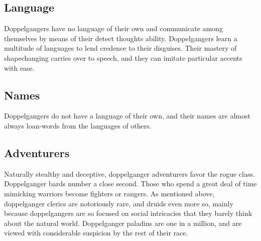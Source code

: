 
\subsection{Language}
{Doppelgangers have no language of their own and communicate among themselves by means of their detect thoughts ability. Doppelgangers learn a multitude of languages to lend credence to their disguises. Their mastery of shapechanging carries over to speech, and they can imitate particular accents with ease. \cite{d-destiny}}

\subsection{Names}
{Doppelgangers do not have a language of their own, and their names are almost always loan-words from the languages of others. \cite{d-hb}}
%

\subsection{Adventurers}
{Naturally stealthy and deceptive, doppelganger adventurers favor the rogue class. Doppelganger bards number a close second. Those who spend a great deal of time mimicking warriors become fighters or rangers. As mentioned above, doppelganger clerics are notoriously rare, and druids even more so, mainly because doppelgangers are so focused on social intricacies that they barely think about the natural world. Doppelganger paladins are one in a million, and are viewed with considerable suspicion by the rest of their race. \cite{d-destiny}}

